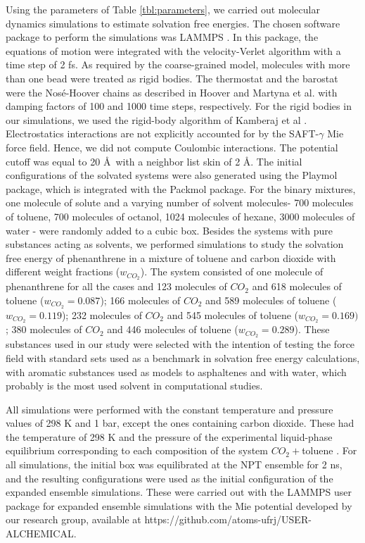 \documentclass[final,12p,times,twocolumn]{elsarticle}
\begin{document}
	
	Using the parameters of Table \ref{tbl:parameters}, we carried out molecular dynamics simulations to estimate solvation free energies. The chosen software package to perform the simulations was LAMMPS  \cite{lammps}. In this package, the equations of motion were integrated with the velocity-Verlet algorithm \cite{verlet} with a time step of 2 fs. As required by the coarse-grained model,  molecules with more than one bead were treated as rigid bodies. The thermostat and the barostat were the Nos\'{e}-Hoover chains as described in Hoover \cite{PhysRevA.31.1695} and Martyna et al.  \cite{doi:10.1063/1.463940} with damping factors of 100 and 1000 time steps, respectively. For the rigid bodies in our simulations, we used the rigid-body algorithm of Kamberaj et al \cite{kamberaj}. Electrostatics interactions are not explicitly accounted for by the SAFT-$\gamma$ Mie force field. Hence, we did not compute Coulombic interactions. The potential cutoff was equal to 20 \AA $\,$ \cite{muller2017} with a neighbor list skin of 2 \AA. The initial configurations of the solvated systems were also generated using the Playmol package, which is integrated with the Packmol package. For the binary mixtures, one molecule of solute and a varying number of solvent molecules- 700 molecules of toluene, 700 molecules of octanol, 1024 molecules of hexane, 3000 molecules of water - were randomly added to a cubic box. Besides the systems with pure substances acting as solvents, we performed simulations to study the solvation free energy of phenanthrene in a mixture of toluene and carbon dioxide with different weight fractions ($w_{CO_{2}}$). The  system consisted of one molecule of phenanthrene for all the cases and 123 molecules of $CO_{2}$ and 618 molecules of toluene ($w_{CO_{2}} = 0.087$); 166 molecules of $CO_{2}$ and 589 molecules of toluene ($w_{CO_{2}} = 0.119$); 232 molecules of $CO_{2}$ and 545 molecules of toluene ($w_{CO_{2}} = 0.169)$; 380 molecules of $CO_{2}$ and 446 molecules of toluene ($w_{CO_{2}} = 0.289$). These substances used in our study were selected with the intention of testing the force field with standard sets used as a benchmark in solvation free energy calculations, with aromatic substances used as models to asphaltenes and with water, which probably is the most used solvent in computational studies.
	
	All simulations were performed with the constant temperature and pressure values of 298 K and 1 bar, except the ones containing carbon dioxide. These had the temperature of 298 K and the pressure of the experimental liquid-phase equilibrium corresponding to each composition of the system $CO_{2}+$toluene \cite{co2toliq}. For all simulations, the initial box was equilibrated at the NPT ensemble for 2 ns, and the resulting configurations were used as the initial configuration of the expanded ensemble simulations. These were carried out with the LAMMPS user package for expanded ensemble simulations with the Mie potential developed by our research group, available at https://github.com/atoms-ufrj/USER-ALCHEMICAL.
	
\end{document}
